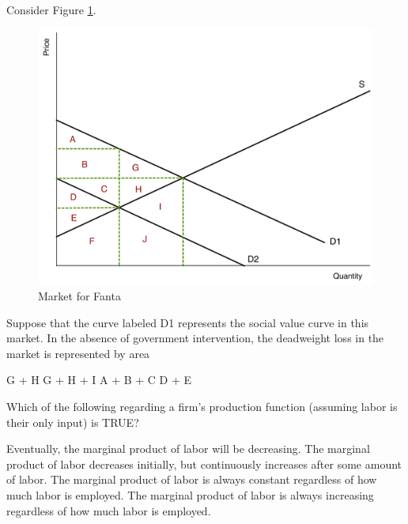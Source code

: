 \documentclass[addpoints,11pt]{exam}
\theoremstyle{definition}
\begin{document}
\begin{questions}
\newpage
	
\question Consider Figure \ref{MC25}. 

\begin{figure}[H]
	\centering
	\includegraphics[scale=.40]{Exam1_MC25.pdf}
	\caption{Market for Fanta}
	\label{MC25}
\end{figure}

Suppose that the curve labeled D1 represents the social value curve in this market. In the absence of government intervention, the deadweight loss in the market is represented by area

\begin{choices}
	\CorrectChoice G + H
	\choice G + H + I
	\choice A + B + C
	\choice D + E
\end{choices}


\question Which of the following regarding a firm's production function (assuming labor is their only input) is TRUE?

\begin{choices}
	\CorrectChoice Eventually, the marginal product of labor will be decreasing.
	\choice The marginal product of labor decreases initially, but continuously increases after some amount of labor.
	\choice The marginal product of labor is always constant regardless of how much labor is employed.  
	\choice The marginal product of labor is always increasing regardless of how much labor is employed.  
\end{choices}



\end{questions}
\end{document}
